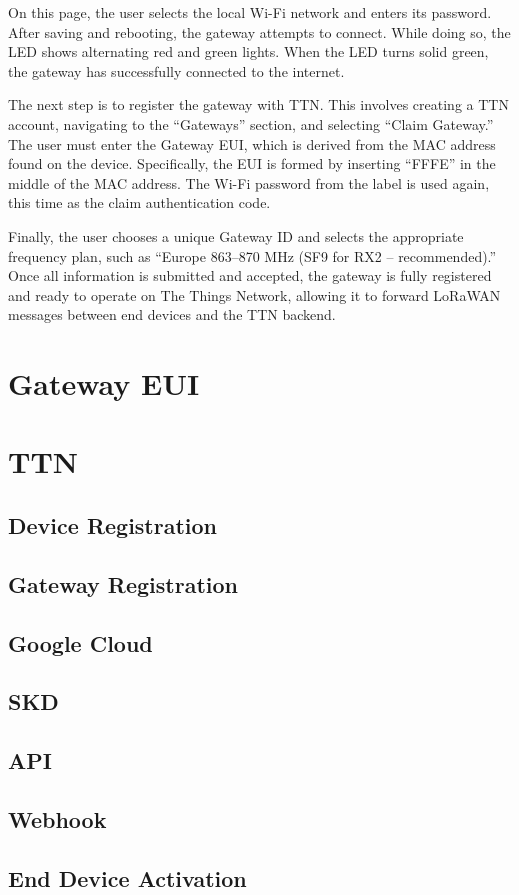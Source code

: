 On this page, the user selects the local Wi-Fi network and enters its password. After saving and rebooting, the gateway attempts to connect. While doing so, the LED shows alternating red and green lights. When the LED turns solid green, the gateway has successfully connected to the internet.

The next step is to register the gateway with TTN. This involves creating a TTN account, navigating to the “Gateways” section, and selecting “Claim Gateway.” The user must enter the Gateway EUI, which is derived from the MAC address found on the device. Specifically, the EUI is formed by inserting “FFFE” in the middle of the MAC address. The Wi-Fi password from the label is used again, this time as the claim authentication code.

Finally, the user chooses a unique Gateway ID and selects the appropriate frequency plan, such as “Europe 863–870 MHz (SF9 for RX2 – recommended).” Once all information is submitted and accepted, the gateway is fully registered and ready to operate on The Things Network, allowing it to forward LoRaWAN messages between end devices and the TTN backend.

\section{Gateway EUI}

\section{TTN}
\subsection{Device Registration}
\subsection{Gateway Registration}

\subsection{Google Cloud}
\subsection{SKD}
\subsection{API}
\subsection{Webhook}
\subsection{End Device Activation}
